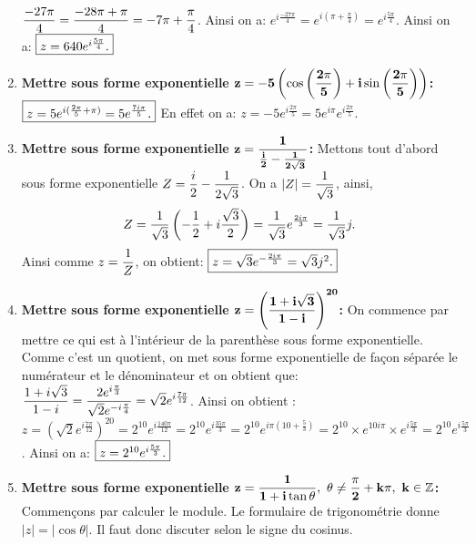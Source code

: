 \documentclass[a4paper, 11pt]{article}
\begin{document}
\begin{correction}
\begin{enumerate}
$\displaystyle\frac{-27\pi}{4}=\displaystyle\frac{-28\pi+\pi}{4}=-7\pi+\displaystyle\frac{\pi}{4}$. Ainsi on a: $e^{i\frac{-27\pi}{4}}=e^{i(\pi+\frac{\pi}{4})}=e^{i\frac{5\pi}{4}}$. Ainsi on a: $\fbox{$ z=640e^{i\frac{5\pi}{4}} .$}$
\item \textbf{Mettre sous forme exponentielle $\mathbf{z=  -5\left(\cos{\left(\displaystyle\frac{2\pi}{5}\right)} +i\sin{\left(\displaystyle\frac{2\pi}{5}\right)}  \right) }$:}
$\fbox{$z=5e^{i(\frac{2\pi}{5}+\pi)}=5e^{\frac{7i\pi}{5}}.$}$ En effet on a: $z=-5e^{i\frac{2\pi}{5}}=5e^{i\pi}e^{i\frac{2\pi}{5}}$.
\item \textbf{Mettre sous forme exponentielle $\mathbf{z= \displaystyle\frac{1}{\frac{i}{2}-\frac{1}{2\sqrt{3}}}  }$:}
Mettons tout d'abord sous forme exponentielle $Z=\displaystyle\frac{i}{2}-\displaystyle\frac{1}{2\sqrt{3}}$.
On a $|Z|=\displaystyle\frac{1}{\sqrt{3}}$, ainsi,
$$Z=\displaystyle\frac{1}{\sqrt{3}}\left(-\frac{1}{2}+i\frac{\sqrt{3}}{2}   \right)=\displaystyle\frac{1}{\sqrt{3}}e^{\frac{2i\pi}{3}}=\displaystyle\frac{1}{\sqrt{3}}j.$$
Ainsi comme $z=\displaystyle\frac{1}{Z}$, on obtient: $\fbox{$z=\sqrt{3}e^{-\frac{2i\pi}{3}}=\sqrt{3}j^2.$}$
\item \textbf{Mettre sous forme exponentielle $\mathbf{z= \left( \displaystyle\frac{1+i\sqrt{3}}{1-i}  \right)^{20}   }$:}
On commence par mettre ce qui est \`{a} l'int\'erieur de la parenth\`{e}se sous forme exponentielle. Comme c'est un quotient, on met sous forme exponentielle de fa\c{c}on s\'epar\'ee le num\'erateur et le d\'enominateur et on obtient que: $\displaystyle\frac{1+i\sqrt{3}}{1-i}=\displaystyle\frac{  2e^{i\frac{\pi}{3}} }{ \sqrt{2}e^{-i\frac{\pi}{4}}   }=\sqrt{2}e^{i\frac{7\pi}{12}}$. Ainsi on obtient : $z=\left(  \sqrt{2}e^{i\frac{7\pi}{12}} \right)^{20}=2^{10}e^{i\frac{140\pi}{12}}=2^{10}e^{i\frac{35\pi}{3}}=2^{10} e^{i\pi(10+\frac{5}{3})}=2^{10}\times e^{10i\pi}\times e^{i\frac{5\pi}{3}}=2^{10}e^{i\frac{5\pi}{3}}$. Ainsi on a: $\fbox{$z=2^{10}e^{i\frac{5\pi}{3}}.$}$
\item \textbf{Mettre sous forme exponentielle $\mathbf{z=  \ddp\frac{1}{1+i\tan{\theta}},\ \theta\not= \ddp\frac{\pi}{2}+k\pi,\ k\in\Z }$:}
Commen\c{c}ons par calculer le module. Le formulaire de trigonom\'etrie donne $|z|=|\cos{\theta}|$. Il faut donc discuter selon le signe du cosinus.
\end{enumerate}
\end{correction}
\end{document}
